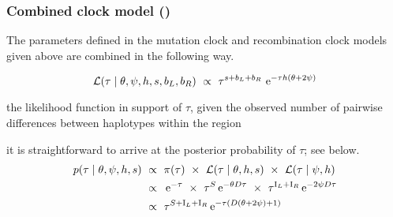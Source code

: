 %
%


%
\subsubsection{Combined clock model (\ClockC)}\label{sec:com_clock}
%



The parameters defined in the mutation clock and recombination clock models given above are combined in the following way.



\begin{equation}\label{eq:com_like}
	\mathcal{L}(\tau \mid \theta,\psi,h,s,b_L,b_R)~\propto~\tau^{s+b_L+b_R} \,\,\mathrm{e}^{-\tau h (\theta+2\psi)}
\end{equation}



the likelihood function in support of $\tau$, given the observed number of pairwise differences between  haplotypes within the region



it is straightforward to arrive at the posterior probability of $\tau$; see below.
\begin{equation}\label{eq:com_post}
\begin{split}
	p(\tau \mid \theta,\psi,h,s)
	& ~\propto~
	\pi(\tau) ~\times~
	\mathcal{L}(\tau \mid \theta, h, s) ~\times~
	\mathcal{L}(\tau \mid \psi, h) \\
	& ~\propto~
	\,\mathrm{e}^{-\tau} ~\times~
	\tau^S \,\mathrm{e}^{-\theta D \tau} ~\times~
	\tau^{\mathrm{I}_L + \mathrm{I}_R} \,\mathrm{e}^{-2 \psi D \tau} \\
	& ~\propto~
	\tau^{S + \mathrm{I}_L + \mathrm{I}_R} \,\mathrm{e}^{-\tau (D(\theta + 2 \psi) + 1)}
\end{split}
\end{equation}

